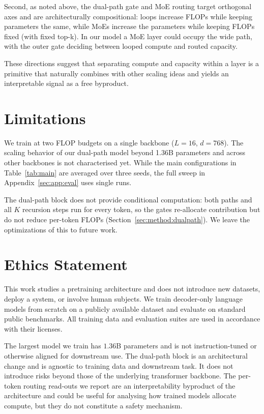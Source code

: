 \documentclass[11pt]{article}
\newcommand{\rev}[1]{{\color{red}#1}}
\begin{document}
Second, as noted above, the dual-path gate and MoE routing target orthogonal axes and are architecturally compositional: loops increase FLOPs while keeping parameters the same, while MoEs increase the parameters while keeping FLOPs fixed (with fixed top-k). In our model a MoE layer could occupy the wide path, with the outer gate deciding between looped compute and routed capacity.

These directions suggest that separating compute and capacity within a layer is a primitive that naturally combines with other scaling ideas and yields an interpretable signal as a free byproduct.

\section{Limitations}
\label{sec:discussion:limitations}

We train at two FLOP budgets on a single backbone ($L = 16$, $d = 768$). The scaling behavior of our dual-path model beyond 1.36B parameters and across other backbones is not characterised yet. \rev{While the main configurations in Table~\ref{tab:main} are averaged over three seeds, the full sweep in Appendix~\ref{sec:app:eval} uses single runs.}

\rev{The dual-path block does not provide conditional computation: both paths and all $K$ recursion steps run for every token, so the gates re-allocate contribution but do not reduce per-token FLOPs (Section~\ref{sec:method:dualpath}). We leave the optimizations of this to future work.}

\section{Ethics Statement}
\label{sec:ethics}

This work studies a pretraining architecture and does not introduce new datasets, deploy a system, or involve human subjects. We train decoder-only language models from scratch on a publicly available dataset and evaluate on standard public benchmarks. All training data and evaluation suites are used in accordance with their licenses.

The largest model we train has $1.36$B parameters and is not instruction-tuned or otherwise aligned for downstream use. The dual-path block is an architectural change and is agnostic to training data and downstream task. It does not introduce risks beyond those of the underlying transformer backbone. The per-token routing read-outs we report are an interpretability byproduct of the architecture and could be useful for analysing how trained models allocate compute, but they do not constitute a safety mechanism.
\end{document}
